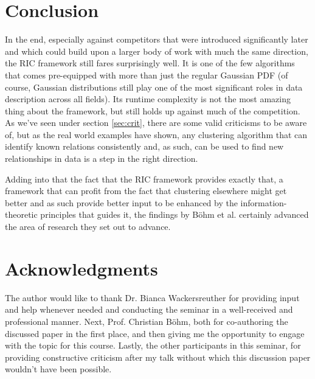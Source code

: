 \documentclass[conference]{IEEEtran}
\begin{document}
\section{Conclusion}
\label{sec:conc}
In the end, especially against competitors that were introduced significantly later and which could build upon a larger body of work with much the same direction, the RIC framework still fares surprisingly well. It is one of the few algorithms that comes pre-equipped with more than just the regular Gaussian PDF (of course, Gaussian distributions still play one of the most significant roles in data description across all fields). Its runtime complexity is not the most amazing thing about the framework, but still holds up against much of the competition. As we've seen under section \ref{sec:crit}, there are some valid criticisms to be aware of, but as the real world examples have shown, any clustering algorithm that can identify known relations consistently and, as such, can be used to find new relationships in data is a step in the right direction.

Adding into that the fact that the RIC framework provides exactly that, a framework that can profit from the fact that clustering elsewhere might get better and as such provide better input to be enhanced by the information-theoretic principles that guides it, the findings by Böhm et al. certainly advanced the area of research they set out to advance.

\section*{Acknowledgments}
The author would like to thank Dr. Bianca Wackersreuther for providing input and help whenever needed and conducting the seminar in a well-received and professional manner. Next, Prof. Christian Böhm, both for co-authoring the discussed paper in the first place, and then giving me the opportunity to engage with the topic for this course. Lastly, the other participants in this seminar, for providing constructive criticism after my talk without which this discussion paper wouldn't have been possible.

{}

\end{document}
